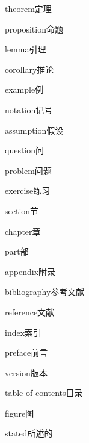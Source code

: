 \begin{multicols}{2}
theorem\hspace{0.9em}定理\par
proposition\hspace{0.9em}命题\par
lemma\hspace{0.9em}引理\par
corollary\hspace{0.9em}推论\par
example\hspace{0.9em}例\par
notation\hspace{0.9em}记号\par
assumption\hspace{0.9em}假设\par
question\hspace{0.9em}问\par
problem\hspace{0.9em}问题\par
exercise\hspace{0.9em}练习\par
section\hspace{0.9em}节\par
chapter\hspace{0.9em}章\par
part\hspace{0.9em}部\par
appendix\hspace{0.9em}附录\par
bibliography\hspace{0.9em}参考文献\par
reference\hspace{0.9em}文献\par
index\hspace{0.9em}索引\par
preface\hspace{0.9em}前言\par
version\hspace{0.9em}版本\par
table of contents\hspace{0.9em}目录\par
figure\hspace{0.9em}图\par
stated\hspace{0.9em}所述的\par
\end{multicols}


